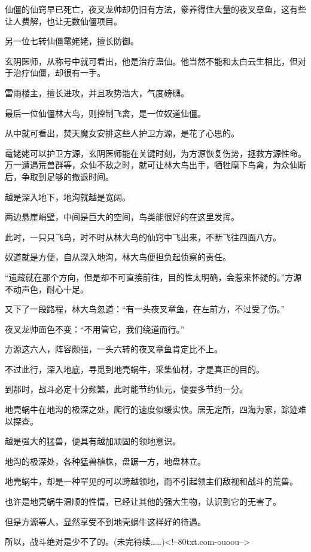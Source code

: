 \begin{this_body}
仙僵的仙窍早已死亡，夜叉龙帅却仍旧有方法，豢养得住大量的夜叉章鱼，这有些让人费解，也让无数仙僵项目。

另一位七转仙僵鼋姥姥，擅长防御。

玄阴医师，从称号中就可看出，他是治疗蛊仙。他当然不能和太白云生相比，但对于治疗仙僵，却很有一手。

雷雨楼主，擅长进攻，并且攻势浩大，气度磅礴。

最后一位仙僵林大鸟，则控制飞禽，是一位奴道仙僵。

从中就可看出，焚天魔女安排这些人护卫方源，是花了心思的。

鼋姥姥可以护卫方源，玄阴医师能在关键时刻，为方源恢复伤势，拯救方源性命。万一遭遇荒兽群等，众仙不敌之时，就可让林大鸟出手，牺牲麾下鸟禽，为众仙断后，争取到足够的撤退时间。

越是深入地下，地沟就越是宽阔。

两边悬崖峭壁，中间是巨大的空间，鸟类能很好的在这里发挥。

此时，一只只飞鸟，时不时从林大鸟的仙窍中飞出来，不断飞往四面八方。

奴道就是方便，自从深入地沟，林大鸟便担负起侦察的责任。

“遗藏就在那个方向，但是却不可直接前往，目的性太明确，会惹来怀疑的。”方源不动声色，耐心十足。

又下了一段路程，林大鸟忽道：“有一头夜叉章鱼，在左前方，不过受了伤。”

夜叉龙帅面色不变：“不用管它，我们绕道而行。”

方源这六人，阵容颇强，一头六转的夜叉章鱼肯定比不上。

不过此行，深入地底，寻觅到地壳蜗牛，采集仙材，才是真正的目的。

到那时，战斗必定十分频繁，此时能节约仙元，便要多节约一分。

地壳蜗牛在地沟的极深之处，爬行的速度似缓实快。居无定所，四海为家，踪迹难以探查。

越是强大的猛兽，便具有越加顽固的领地意识。

地沟的极深处，各种猛兽植株，盘踞一方，地盘林立。

地壳蜗牛，却是一种罕见的可以跨越领地，而不引起领主们敌视和战斗的荒兽。

也许是地壳蜗牛温顺的性情，已经让其他的强大生物，认识到它的无害了。

但是方源等人，显然享受不到地壳蜗牛这样好的待遇。

所以，战斗绝对是少不了的。(未完待续……)<!--80txt.com-ouoou-->

\end{this_body}

